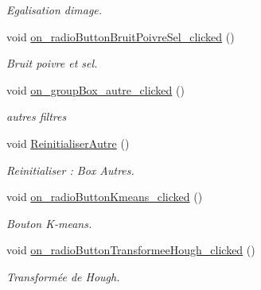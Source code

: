 \begin{DoxyCompactItemize}
\begin{DoxyCompactList}\small\item\em Egalisation d\textquotesingle{}image. \end{DoxyCompactList}\item 
\mbox{\label{classMainWindow_afe756729e53a981bfd2e25f0551c378b}} 
void \hyperlink{classMainWindow_afe756729e53a981bfd2e25f0551c378b}{on\+\_\+radio\+Button\+Bruit\+Poivre\+Sel\+\_\+clicked} ()
\begin{DoxyCompactList}\small\item\em Bruit poivre et sel. \end{DoxyCompactList}\item 
\mbox{\label{classMainWindow_a908bfb9e085d25a116ad56ec8e976f5d}} 
void \hyperlink{classMainWindow_a908bfb9e085d25a116ad56ec8e976f5d}{on\+\_\+group\+Box\+\_\+autre\+\_\+clicked} ()
\begin{DoxyCompactList}\small\item\em autres filtres \end{DoxyCompactList}\item 
\mbox{\label{classMainWindow_aa2fe1d15891827da32e14c28567fc66a}} 
void \hyperlink{classMainWindow_aa2fe1d15891827da32e14c28567fc66a}{Reinitialiser\+Autre} ()
\begin{DoxyCompactList}\small\item\em Reinitialiser \+: Box Autres. \end{DoxyCompactList}\item 
\mbox{\label{classMainWindow_a78ca3c2a493a26f99743a6833a35a6f7}} 
void \hyperlink{classMainWindow_a78ca3c2a493a26f99743a6833a35a6f7}{on\+\_\+radio\+Button\+Kmeans\+\_\+clicked} ()
\begin{DoxyCompactList}\small\item\em Bouton K-\/means. \end{DoxyCompactList}\item 
\mbox{\label{classMainWindow_a04343ce587aba1572cac5247e6a27816}} 
void \hyperlink{classMainWindow_a04343ce587aba1572cac5247e6a27816}{on\+\_\+radio\+Button\+Transformee\+Hough\+\_\+clicked} ()
\begin{DoxyCompactList}\small\item\em Transformée de Hough. \end{DoxyCompactList}\item 

\end{DoxyCompactItemize}
